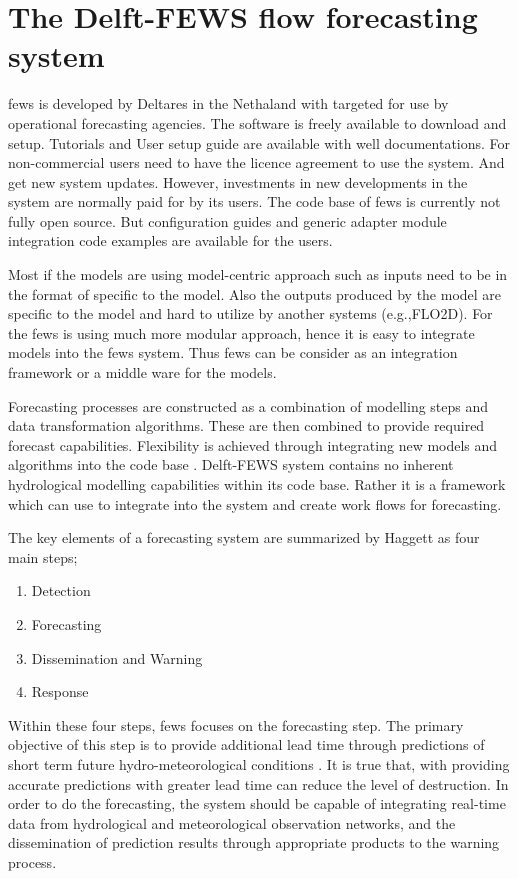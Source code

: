 \documentclass[a4paper,oneside,12pt]{report}
\begin{document}
\section{The Delft-FEWS flow forecasting system}
 \acrshort{fews} is developed by Deltares in the Nethaland with targeted for use by operational forecasting agencies. The software is freely available to download and setup. Tutorials and User setup guide \cite{DeltaresPublicWikiDelft-FEWSGuide} are available with well documentations. For non-commercial users need to have the licence agreement to use the system. And get new system updates. However, investments in new developments in the system are normally paid for by its users. The code base of \acrshort{fews} is currently not fully open source. But configuration guides and generic adapter module integration code examples are available for the users.

Most if the models are using model-centric approach such as inputs need to be in the format of specific to the model. Also the outputs produced by the model are specific to the model and hard to utilize by another systems (e.g.,FLO2D). For the \acrshort{fews} is using much more modular approach, hence it is easy to integrate models into the \acrshort{fews} system. Thus \acrshort{fews} can be consider as an integration framework or a middle ware for the models.

Forecasting processes are constructed as a combination of modelling steps and data transformation algorithms. These are then combined to provide required forecast capabilities. Flexibility is achieved through integrating new models and algorithms into the code base \cite{Werner2013TheSystem}. Delft-FEWS system contains no inherent hydrological modelling capabilities within its code base. Rather it is a framework which can use to integrate into the system and create work flows for forecasting.

The key elements of a forecasting system are summarized by Haggett \cite{Haggett1998AnWales} as four main steps;
\begin{enumerate}
\item Detection
\item Forecasting
\item Dissemination and Warning
\item Response
\end{enumerate}
Within these four steps, \acrshort{fews} focuses on the forecasting step. The primary objective of this step is to provide additional lead time through predictions of short term future hydro-meteorological conditions \cite{Werner2005FloodCatchments}. It is true that, with providing accurate predictions with greater lead time can reduce the level of destruction. In order to do the forecasting, the system should be capable of integrating real-time data from hydrological and meteorological observation networks, and the dissemination of prediction results through appropriate products to the warning process.
\end{document}
